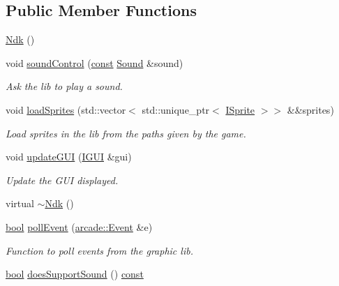 \subsection*{Public Member Functions}
\begin{DoxyCompactItemize}
\item 
\hyperlink{classarcade_1_1_ndk_a713cddcbfca815b101608777b61574e2}{Ndk} ()
\item 
void \hyperlink{classarcade_1_1_ndk_a39a2e8baa7e06daac36e7dd1914b4ff3}{sound\-Control} (\hyperlink{term__entry_8h_a57bd63ce7f9a353488880e3de6692d5a}{const} \hyperlink{structarcade_1_1_sound}{Sound} \&sound)
\begin{DoxyCompactList}\small\item\em Ask the lib to play a sound. \end{DoxyCompactList}\item 
void \hyperlink{classarcade_1_1_ndk_afa21f93ed0ef656af1d326bb92436a7f}{load\-Sprites} (std\-::vector$<$ std\-::unique\-\_\-ptr$<$ \hyperlink{classarcade_1_1_i_sprite}{I\-Sprite} $>$$>$ \&\&sprites)
\begin{DoxyCompactList}\small\item\em Load sprites in the lib from the paths given by the game. \end{DoxyCompactList}\item 
void \hyperlink{classarcade_1_1_ndk_aa34269ca08bb92848ae0c8729a8c2ab5}{update\-G\-U\-I} (\hyperlink{classarcade_1_1_i_g_u_i}{I\-G\-U\-I} \&gui)
\begin{DoxyCompactList}\small\item\em Update the G\-U\-I displayed. \end{DoxyCompactList}\item 
virtual \hyperlink{classarcade_1_1_ndk_a06951c6df821fed974796001bde45fd8}{$\sim$\-Ndk} ()
\item 
\hyperlink{term__entry_8h_a002004ba5d663f149f6c38064926abac}{bool} \hyperlink{classarcade_1_1_ndk_a9ff9241bacff0821e13282a994d5abcd}{poll\-Event} (\hyperlink{structarcade_1_1_event}{arcade\-::\-Event} \&e)
\begin{DoxyCompactList}\small\item\em Function to poll events from the graphic lib. \end{DoxyCompactList}\item 
\hyperlink{term__entry_8h_a002004ba5d663f149f6c38064926abac}{bool} \hyperlink{classarcade_1_1_ndk_af1fa849385e0c6c6c9b99629bea6efa4}{does\-Support\-Sound} () \hyperlink{term__entry_8h_a57bd63ce7f9a353488880e3de6692d5a}{const} 
$$
\end{DoxyCompactItemize}
